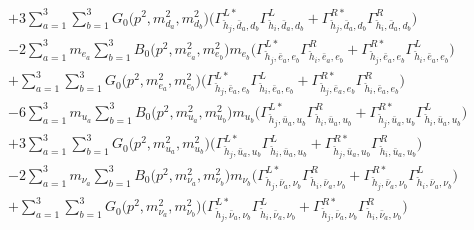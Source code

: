 \begin{itemize}
\begin{align}
 &+3 \sum_{a=1}^{3}\sum_{b=1}^{3}{G_0\Big(p^{2},m^2_{d_{{a}}},m^2_{d_{{b}}}\Big)} \Big({\Gamma^{L*}_{\check{h}_{{j}},\bar{d}_{{a}},d_{{b}}}} {\Gamma^L_{\check{h}_{{i}},\bar{d}_{{a}},d_{{b}}}}  + {\Gamma^{R*}_{\check{h}_{{j}},\bar{d}_{{a}},d_{{b}}}} {\Gamma^R_{\check{h}_{{i}},\bar{d}_{{a}},d_{{b}}}} \Big) \nonumber \\ 
 &-2 \sum_{a=1}^{3}m_{e_{{a}}} \sum_{b=1}^{3}{B_0\Big(p^{2},m^2_{e_{{a}}},m^2_{e_{{b}}}\Big)} m_{e_{{b}}} \Big({\Gamma^{L*}_{\check{h}_{{j}},\bar{e}_{{a}},e_{{b}}}} {\Gamma^R_{\check{h}_{{i}},\bar{e}_{{a}},e_{{b}}}}  + {\Gamma^{R*}_{\check{h}_{{j}},\bar{e}_{{a}},e_{{b}}}} {\Gamma^L_{\check{h}_{{i}},\bar{e}_{{a}},e_{{b}}}} \Big)  \nonumber \\ 
 &+\sum_{a=1}^{3}\sum_{b=1}^{3}{G_0\Big(p^{2},m^2_{e_{{a}}},m^2_{e_{{b}}}\Big)} \Big({\Gamma^{L*}_{\check{h}_{{j}},\bar{e}_{{a}},e_{{b}}}} {\Gamma^L_{\check{h}_{{i}},\bar{e}_{{a}},e_{{b}}}}  + {\Gamma^{R*}_{\check{h}_{{j}},\bar{e}_{{a}},e_{{b}}}} {\Gamma^R_{\check{h}_{{i}},\bar{e}_{{a}},e_{{b}}}} \Big)\nonumber \\ 
 &-6 \sum_{a=1}^{3}m_{u_{{a}}} \sum_{b=1}^{3}{B_0\Big(p^{2},m^2_{u_{{a}}},m^2_{u_{{b}}}\Big)} m_{u_{{b}}} \Big({\Gamma^{L*}_{\check{h}_{{j}},\bar{u}_{{a}},u_{{b}}}} {\Gamma^R_{\check{h}_{{i}},\bar{u}_{{a}},u_{{b}}}}  + {\Gamma^{R*}_{\check{h}_{{j}},\bar{u}_{{a}},u_{{b}}}} {\Gamma^L_{\check{h}_{{i}},\bar{u}_{{a}},u_{{b}}}} \Big)  \nonumber \\ 
 &+3 \sum_{a=1}^{3}\sum_{b=1}^{3}{G_0\Big(p^{2},m^2_{u_{{a}}},m^2_{u_{{b}}}\Big)} \Big({\Gamma^{L*}_{\check{h}_{{j}},\bar{u}_{{a}},u_{{b}}}} {\Gamma^L_{\check{h}_{{i}},\bar{u}_{{a}},u_{{b}}}}  + {\Gamma^{R*}_{\check{h}_{{j}},\bar{u}_{{a}},u_{{b}}}} {\Gamma^R_{\check{h}_{{i}},\bar{u}_{{a}},u_{{b}}}} \Big) \nonumber \\ 
 &-2 \sum_{a=1}^{3}m_{\nu_{{a}}} \sum_{b=1}^{3}{B_0\Big(p^{2},m^2_{\nu_{{a}}},m^2_{\nu_{{b}}}\Big)} m_{\nu_{{b}}} \Big({\Gamma^{L*}_{\check{h}_{{j}},\bar{\nu}_{{a}},\nu_{{b}}}} {\Gamma^R_{\check{h}_{{i}},\bar{\nu}_{{a}},\nu_{{b}}}}  + {\Gamma^{R*}_{\check{h}_{{j}},\bar{\nu}_{{a}},\nu_{{b}}}} {\Gamma^L_{\check{h}_{{i}},\bar{\nu}_{{a}},\nu_{{b}}}} \Big)  \nonumber \\ 
 &+\sum_{a=1}^{3}\sum_{b=1}^{3}{G_0\Big(p^{2},m^2_{\nu_{{a}}},m^2_{\nu_{{b}}}\Big)} \Big({\Gamma^{L*}_{\check{h}_{{j}},\bar{\nu}_{{a}},\nu_{{b}}}} {\Gamma^L_{\check{h}_{{i}},\bar{\nu}_{{a}},\nu_{{b}}}}  + {\Gamma^{R*}_{\check{h}_{{j}},\bar{\nu}_{{a}},\nu_{{b}}}} {\Gamma^R_{\check{h}_{{i}},\bar{\nu}_{{a}},\nu_{{b}}}} \Big)\nonumber \\ 

\end{align}
\end{itemize}
